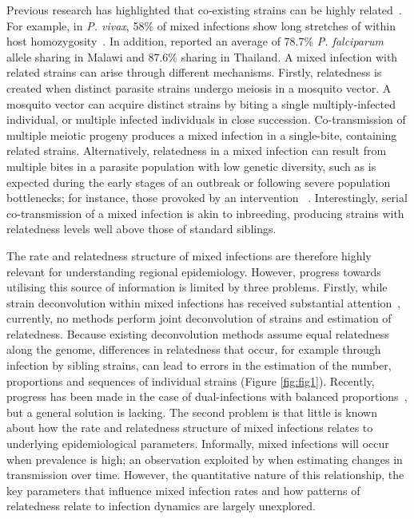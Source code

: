 \documentclass[9pt,lineno]{elife}
\begin{document}
Previous research has highlighted that co-existing strains can be highly related~\citep{Nair2014, Trevino2017}.  For example, in {\it P. vivax}, 58\% of mixed infections show long stretches of within host homozygosity~\citep{Pearson2016}. In addition, \citet{Nkhoma2012} reported an average of 78.7\% {\it P. falciparum} allele sharing in Malawi and 87.6\% sharing in Thailand. A mixed infection with related strains can arise through different mechanisms. Firstly, relatedness is created when distinct parasite strains undergo meiosis in a mosquito vector. A mosquito vector can acquire distinct strains by biting a single multiply-infected individual, or multiple infected individuals in close succession.  Co-transmission of multiple meiotic progeny produces a mixed infection in a single-bite, containing related strains.  Alternatively, relatedness in a mixed infection can result from multiple bites in a parasite population with low genetic diversity, such as is expected during the early stages of an outbreak or following severe population bottlenecks; for instance, those provoked by an intervention ~\citep{Mouzin2010, Wong2017, Daniels2015}. Interestingly, serial co-transmission of a mixed infection is akin to inbreeding, producing strains with relatedness levels well above those of standard siblings.

The rate and relatedness structure of mixed infections are therefore highly relevant for understanding regional epidemiology.  However, progress towards utilising this source of information is limited by three problems.  Firstly, while strain deconvolution within mixed infections has received substantial attention~\citep{Galinsky2015, Jack2016, Chang2017, Zhu2017}, currently, no methods perform joint deconvolution of strains and estimation of relatedness.  Because existing deconvolution methods assume equal relatedness along the genome, differences in relatedness that occur, for example through infection by sibling strains, can lead to errors in the estimation of the number, proportions and sequences of individual strains (Figure \ref{fig:fig1}).  Recently, progress has been made in the case of dual-infections with balanced proportions~\citep{Henden2016}, but a general solution is lacking.  The second problem is that little is known about how the rate and relatedness structure of mixed infections relates to underlying epidemiological parameters.  Informally, mixed infections will occur when prevalence is high; an observation exploited by \citet{Cerqueira2017} when estimating changes in transmission over time.  However, the quantitative nature of this relationship, the key parameters that influence mixed infection rates and how patterns of relatedness relate to infection dynamics are largely unexplored.
\end{document}
